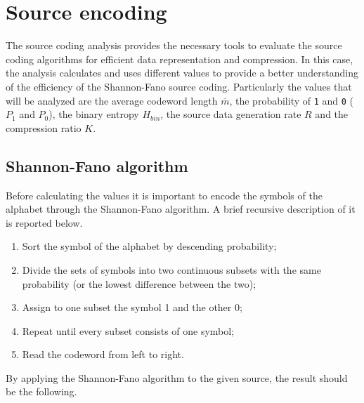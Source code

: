 \vspace{40px} \section{Source encoding} \label{source-encoding}
The source coding analysis provides the necessary tools to evaluate the source coding algorithms for efficient data representation and compression. In this case, the analysis calculates and uses different values to provide a better understanding of the efficiency of the Shannon-Fano source coding. Particularly the values that will be analyzed are the average codeword length $\overline{m}$, the probability of \texttt{1} and \texttt{0} ($P_1$ and $P_0$), the binary entropy $H_{bin}$, the source data generation rate $R$ and the compression ratio $K$.


\subsection{Shannon-Fano algorithm}
Before calculating the values it is important to encode the symbols of the alphabet through the Shannon-Fano algorithm. A brief recursive description of it is reported below.
\begin{enumerate}
    \item Sort the symbol of the alphabet by descending probability;
    \item Divide the sets of symbols into two continuous subsets with the same probability (or the lowest difference between the two);
    \item Assign to one subset the symbol 1 and the other 0;
    \item Repeat until every subset consists of one symbol;
    \item Read the codeword from left to right.
\end{enumerate} 

\noindent By applying the Shannon-Fano algorithm to the given source, the result should be the following.

